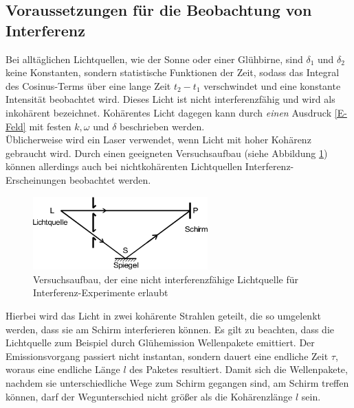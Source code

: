 \subsection*{Voraussetzungen für die Beobachtung von Interferenz}
Bei alltäglichen Lichtquellen, wie der Sonne oder einer Glühbirne, sind $\delta_1$ und $\delta_2$ keine Konstanten, sondern statistische Funktionen der Zeit, sodass das Integral des Cosinus-Terms über eine lange Zeit $t_2-t_1$ verschwindet und eine konstante Intensität beobachtet wird. Dieses Licht ist nicht interferenzfähig und wird als inkohärent bezeichnet. Kohärentes Licht dagegen kann durch \emph{einen} Ausdruck \eqref{E-Feld} mit festen $k, \omega$ und $\delta$ beschrieben werden. \\
Üblicherweise wird ein Laser verwendet, wenn Licht mit hoher Kohärenz gebraucht wird. Durch einen geeigneten Versuchsaufbau (siehe Abbildung \ref{Gluhlampe}) können allerdings auch bei nichtkohärenten Lichtquellen Interferenz-Erscheinungen beobachtet werden.
\begin{figure}[h!]
	\centering
	\includegraphics[width=0.6\textwidth]{Koharenz_Gluhlampe.png}
	\caption{Versuchsaufbau, der eine nicht interferenzfähige Lichtquelle für Interferenz-Experimente erlaubt}
	\label{Gluhlampe}
\end{figure} 
Hierbei wird das Licht in zwei kohärente Strahlen geteilt, die so umgelenkt werden, dass sie am Schirm interferieren können. Es gilt zu beachten, dass die Lichtquelle zum Beispiel durch Glühemission Wellenpakete emittiert. Der Emissionsvorgang passiert nicht instantan, sondern dauert eine endliche Zeit $\tau$, woraus eine endliche Länge $l$ des Paketes resultiert. Damit sich die Wellenpakete, nachdem sie unterschiedliche Wege zum Schirm gegangen sind, am Schirm treffen können, darf der Wegunterschied nicht größer als die Kohärenzlänge $l$ sein.